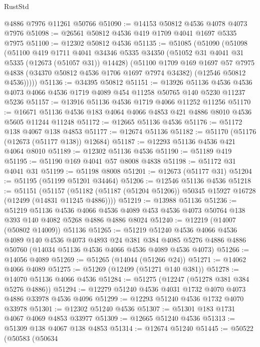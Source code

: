 \begin{lexlean}{RustStd}
\begin{coremodule}
{\begin{coremodule}
{{{{{{{{{{{{{{{{{{{{{{{{{{{{{{{{{{{{{{{{{{{{{{{{{{{{{{{{{{{{{{{{{{{{{{{{{{{{{{{{    @4886
    @7976
    @11261
    @50766
@51090 := @14153 @50812 @4536 @4078 @4073 @7976
@51098 := @26561 @50812 @4536 @419 @1709 @4041 @1697 @5335 @7975
@51100 := @12302 @50812 @4536
@51135 := @51085
    (@51090
      (@51098
        (@51100
          @419
          @1711
          @4041
          @34346
          @5335
          @34350
          (@51052 @31 @4041 @31 @5335 (@12673 (@51057 @31)) @14428)
          (@51100
            @1709
            @169
            @1697
            @57
            @7975
            @4838
            (@34370 @50812 @4536 @1706 @1697 @7974 @34382)
            (@12546 @50812 @4536)))))
@51136 := @34395 @50812
@51151 := @13926
    @51136
    @4536
    @4536
    @4073
    @4066
    @4536
    @1719
    @4089
    @454
    @11258
    @50765
    @140
    @5230
    @11237
    @5236
@51157 := @13916 @51136 @4536 @1719 @4066 @11252 @11256
@51170 := @16671 @51136 @4536 @183 @4064 @4066 @4853 @421 @4886 @8010 @4536 @5605 @11244 @11248
@51172 := @12665 @51136 @4536
@51176 := @51172 @138 @4067 @138 @4853
@51177 := @12674 @51136
@51182 := @51170 (@51176 (@12673 (@51177 @138)) @12684)
@51187 := @12293 @51136 @4536 @421 @4064 @8010
@51189 := @12302 @51136 @4536
@51190 := @51189 @419
@51195 := @51190 @169 @4041 @57 @8008 @4838
@51198 := @51172 @31 @4041 @31
@51199 := @51198 @8008
@51201 := @12673 (@51177 @31)
@51204 := @51195 (@51199 @51201 @34464)
@51206 := @12546 @51136 @4536
@51218 := @51151
    (@51157 (@51182 (@51187 (@51204 @51206)) @50345 @15927 @16728 (@12499 (@14831 @11245 @4886))))
@51219 := @13988 @51136
@51236 := @51219
    @51136
    @4536
    @4066
    @4536
    @4089
    @453
    @4536
    @4073
    @50764
    @138
    @393
    @140
    @4082
    @5268
    @4886
    @4886
    @8024
@51240 := @12219 (@14007 (@50802 @14009)) @51136
@51265 := @51219
    @51240
    @4536
    @4066
    @4536
    @4089
    @140
    @4536
    @4073
    @4893
    @24
    @381
    @384
    @4085
    @5276
    @4886
    @4886
    @50760
    (@14034 @51136 @4536 @4066 @4536 @4089 @4536 @4073)
@51266 := @14056 @4089
@51269 := @51265 (@14044 (@51266 @24))
@51271 := @14062 @4066 @4089
@51275 := @51269 (@12499 (@51271 @140 @381))
@51278 := @14070 @51136 @4066 @4536
@51284 := @51275 (@12247 (@51278 @381 @384 @5276 @4886))
@51294 := @12279 @51240 @4536 @4031 @1732 @4070 @4073 @4886 @33978 @4536 @4096
@51299 := @12293 @51240 @4536 @1732 @4070 @33978
@51301 := @12302 @51240 @4536
@51307 := @51301 @183 @1731 @4067 @4069 @4853 @33977
@51309 := @12665 @51240 @4536
@51313 := @51309 @138 @4067 @138 @4853
@51314 := @12674 @51240
@51445 := @50522
    (@50583
      (@50634
}}}}}}}}}}}}}}}}}}}}}}}}}}}}}}}}}}}}}}}}}}}}}}}}}}}}}}}}}}}}}}}}}}}}}}}}}}}}}}}}
\end{coremodule}}
\end{coremodule}
\end{lexlean}
